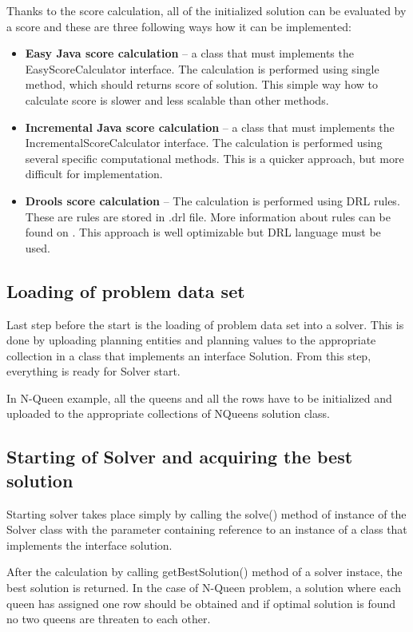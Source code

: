 Thanks to the score calculation, all of the initialized solution can be evaluated by a score and these are three following ways how it can be implemented:

\begin{itemize}
\item \textbf{Easy Java score calculation} -- a class that must implements the EasyScoreCalculator interface. The calculation is performed using single method, which should returns score of solution. This simple way how to calculate score is slower and less scalable than other methods.
\item \textbf{Incremental Java score calculation} -- a class that must implements the IncrementalScoreCalculator interface. The calculation is performed using several specific computational methods. This is a quicker approach, but more difficult for implementation.
\item \textbf{Drools score calculation} -- The calculation is performed using DRL rules. These are rules are stored in .drl file. More information about rules can be found on \cite{DroolsBook}. This approach is well optimizable but DRL language must be used.
\end{itemize}

\subsection{Loading of problem data set}
Last step before the start is the loading of problem data set into a solver. This is done by uploading planning entities and planning values to the appropriate collection in a class that implements an interface Solution. From this step, everything is ready for Solver start.

In N-Queen example, all the queens and all the rows have to be initialized and uploaded to the appropriate collections of NQueens solution class.

\subsection{Starting of Solver and acquiring the best solution}
Starting solver takes place simply by calling the solve() method of instance of the Solver class with the parameter containing reference to an instance of a class that implements the interface solution.

After the calculation by calling getBestSolution() method of a solver instace, the best solution is returned. In the case of N-Queen problem, a solution where each queen has assigned one row should be obtained and if optimal solution is found no two queens are threaten to each other.

